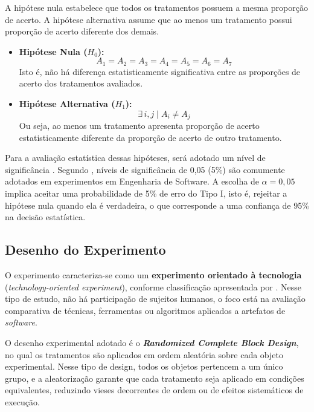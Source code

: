 A hipótese nula estabelece que todos os tratamentos possuem a mesma proporção de acerto. A hipótese alternativa assume que ao menos um tratamento possui proporção de acerto diferente dos demais.

\begin{itemize}
    \item \textbf{Hipótese Nula ($H_{0}$):} 
    \[
        A_{1} = A_{2} = A_{3} = A_{4} = A_{5} = A_{6} = A_{7}
    \]
    Isto é, não há diferença estatisticamente significativa entre as proporções de acerto dos tratamentos avaliados.
        \item \textbf{Hipótese Alternativa ($H_{1}$):}
    \[
        \exists\, i,j \mid A_{i} \neq A_{j}
    \]
    Ou seja, ao menos um tratamento apresenta proporção de acerto estatisticamente diferente da proporção de acerto de outro tratamento.
\end{itemize}

Para a avaliação estatística dessas hipóteses, será adotado um nível de significância 
. Segundo , níveis de significância de 0,05 (5\%) são comumente adotados em experimentos em Engenharia de Software. A escolha de $\alpha = 0{,}05$ implica aceitar uma probabilidade de 5\% de erro do Tipo I, isto é, rejeitar a hipótese nula quando ela é verdadeira, o que corresponde a uma confiança de 95\% na decisão estatística.

\subsection{Desenho do Experimento}

O experimento caracteriza-se como um \textbf{experimento orientado à tecnologia}
(\textit{technology-oriented experiment}), conforme classificação apresentada por
. Nesse tipo de estudo, não há participação de sujeitos humanos,
o foco está na avaliação comparativa de técnicas, ferramentas ou algoritmos aplicados
a artefatos de \textit{software}.

O desenho experimental adotado é o \textbf{\textit{Randomized Complete Block Design}}, 
no qual os tratamentos são aplicados em ordem aleatória sobre cada objeto experimental.
Nesse tipo de design, todos os objetos pertencem a um único grupo, e a aleatorização 
garante que cada tratamento seja aplicado em condições equivalentes, reduzindo vieses 
decorrentes de ordem ou de efeitos sistemáticos de execução.

